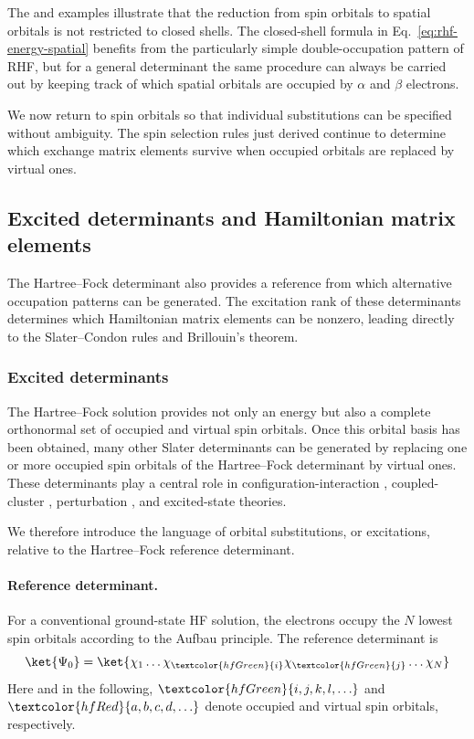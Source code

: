 \documentclass[11pt,a4paper,titlepage]{article}
\numberwithin{equation}{section}
\newcommand{\red}[1]{\textcolor{hfRed}{#1}}
\newcommand{\green}[1]{\textcolor{hfGreen}{#1}}
\begin{document}
The  and  examples illustrate that the reduction from spin
orbitals to spatial orbitals is not restricted to closed shells. The
closed-shell formula in Eq.~\eqref{eq:rhf-energy-spatial} benefits from the
particularly simple double-occupation pattern of RHF, but for a general
determinant the same procedure can always be carried out by keeping track of
which spatial orbitals are occupied by $\alpha$ and $\beta$ electrons.

We now return to spin orbitals so that individual substitutions can be
specified without ambiguity. The spin selection rules just derived continue
to determine which exchange matrix elements survive when occupied orbitals
are replaced by virtual ones.

\subsection{Excited determinants and Hamiltonian matrix elements}

The Hartree--Fock determinant also provides a reference from which alternative
occupation patterns can be generated. The excitation rank of these
determinants determines which Hamiltonian matrix elements can be nonzero,
leading directly to the Slater--Condon rules and Brillouin's theorem.

\subsubsection{Excited determinants}

The Hartree--Fock solution provides not only an energy but also a complete
orthonormal set of occupied and virtual spin orbitals. Once this orbital basis
has been obtained, many other Slater determinants can be generated by
replacing one or more occupied spin orbitals of the Hartree--Fock determinant by virtual
ones. These determinants play a central role in configuration-interaction
\citep{Shavitt1998}, coupled-cluster \citep{Cizek1966,BartlettMusial2007},
perturbation \citep{MollerPlesset1934,Cremer2011}, and excited-state theories.

We therefore introduce the language of orbital substitutions, or
excitations, relative to the Hartree--Fock reference determinant.

\paragraph{Reference determinant.}

For a conventional ground-state HF solution, the electrons occupy the $N$
lowest spin orbitals according to the Aufbau principle. The reference
determinant is
\begin{equation}
  \ket{\Psi_0}
  =
  \ket{
    \chi_1
    \ldots
    \chi_{\green{i}}
    \chi_{\green{j}}
    \ldots
    \chi_N
  }
  \label{eq:hf-reference-determinant}
\end{equation}
Here and in the following,
  $\green{i,j,k,l,\ldots}$
  and
  $\red{a,b,c,d,\ldots}$
denote occupied and virtual spin orbitals, respectively.
\end{document}
